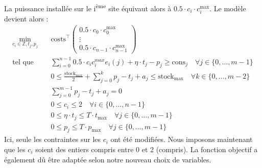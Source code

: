 \documentclass{article}
\begin{document}
\noindent La puissance installée sur le i\textsuperscript{ème} site équivaut alors à $0.5 \cdot c_i \cdot c_i^\mathrm{max}$. Le modèle devient alors :
\begin{align}
    \min_{c_{i} \in \mathbb{Z},t_j,p_j} \quad &\mathrm{costs}^\intercal 
    \begin{pmatrix}
        0.5 \cdot c_0 \cdot c_0^\mathrm{max}\\
        \vdots\\
        0.5 \cdot c_{n-1} \cdot c_{n-1}^\mathrm{max}
    \end{pmatrix} \nonumber\\
    \textrm{tel que} \quad & \sum_{i=0}^{n-1} 0.5 \cdot c_ic_i^{max} e_i(j) + \eta \cdot t_j - p_j \ge \mathrm{cons}_j \quad \forall j \in  \{ 0, \ldots, m-1 \}\label{eq:5_contr1}\\
    & 0 \le \frac{\mathrm{stock}_\mathrm{max}}{2}  + \sum_{j=0}^{k} p_j - t_j + a_j \le  \mathrm{stock}_\mathrm{max} \quad \forall k \in \{ 0, \ldots, m-2 \}\label{eq:5_contr2}\\
    & \sum_{j=0}^{m-1} p_j - t_j + a_j = 0 \label{eq:5_contr3}\\
    & 0\le c_i \le 2 \quad \forall i \in  \{ 0, \ldots, n-1 \} \label{eq:5_contr4}  \\
    & 0 \le \eta \cdot t_j \le T \cdot t_\mathrm{max} \quad \forall j \in  \{ 0, \ldots, m-1 \} \label{eq:5_contr5}\\
    & 0 \le p_j \le T \cdot p_\mathrm{max} \quad \forall j \in  \{ 0, \ldots, m-1 \} \label{eq:5_contr6} 
\end{align}
Ici, seule les contraintes sur les $c_i$ ont été modifiées. Nous imposons maintenant que les $c_i$ soient des entiers compris entre 0 et 2 (compris).
La fonction objectif a également dû être adaptée selon notre nouveau choix de variables.

\pagebreak
\end{document}
